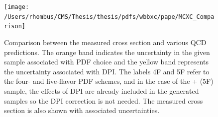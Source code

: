 \begin{figure}[htbp]
\caption[Cross section comparison for \wbb and generators]{
 Comparison between the measured \ppwbblnbb cross section and 
  various QCD predictions.
 The orange band indicates the uncertainty 
  in the given sample associated with PDF choice
  and the yellow band represents the uncertainty
  associated with DPI.
 The labels 4F and 5F refer to the four- and five-flavor
  PDF schemes, and 
  in the case of the \MADGRAPH + \textsc{} (5F) sample,
  the effects of DPI are already included in the generated
  samples so the DPI correction is not needed.
 The measured cross section is also shown with associated uncertainties.
 }
\center
\texttt{[image: /Users/rhombus/CMS/Thesis/thesis/pdfs/wbbxc/pape/MCXC\_Comparison]}
\label{fig:xc_comparison}
\end{figure}

